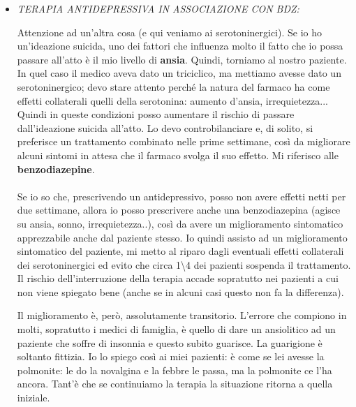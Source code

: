 \begin{itemize}
\item
  \emph{TERAPIA ANTIDEPRESSIVA IN ASSOCIAZIONE CON BDZ:}

Attenzione ad un'altra cosa (e qui veniamo ai serotoninergici). Se io ho
un'ideazione suicida, uno dei fattori che influenza molto il fatto che
io possa passare all'atto è il mio livello di \textbf{ansia}. Quindi,
torniamo al nostro paziente. In quel caso il medico aveva dato un
triciclico, ma mettiamo avesse dato un serotoninergico; devo stare
attento perché la natura del farmaco ha come effetti collaterali quelli
della serotonina: aumento d'ansia, irrequietezza... Quindi in queste
condizioni posso aumentare il rischio di passare dall'ideazione suicida
all'atto. Lo devo controbilanciare e, di solito, si preferisce un
trattamento combinato nelle prime settimane, così da migliorare alcuni
sintomi in attesa che il farmaco svolga il suo effetto. Mi riferisco
alle \textbf{benzodiazepine}.
\\\\
Se io so che, prescrivendo un antidepressivo, posso non avere effetti
netti per due settimane, allora io posso prescrivere anche una
benzodiazepina (agisce su ansia, sonno, irrequietezza..), così da avere
un miglioramento sintomatico apprezzabile anche dal paziente stesso. Io
quindi assisto ad un miglioramento sintomatico del paziente, mi metto al
riparo dagli eventuali effetti collaterali dei serotoninergici ed evito
che circa 1\textbackslash{}4 dei pazienti sospenda il trattamento. Il
rischio dell'interruzione della terapia accade sopratutto nei pazienti a
cui non viene spiegato bene (anche se in alcuni casi questo non fa la
differenza).

Il miglioramento è, però, assolutamente transitorio. L'errore che
compiono in molti, sopratutto i medici di famiglia, è quello di dare un
ansiolitico ad un paziente che soffre di insonnia e questo subito
guarisce. La guarigione è soltanto fittizia. Io lo spiego così ai miei
pazienti: è come se lei avesse la polmonite: le do la novalgina e la
febbre le passa, ma la polmonite ce l'ha ancora. Tant'è che se
continuiamo la terapia la situazione ritorna a quella iniziale.


\end{itemize}
